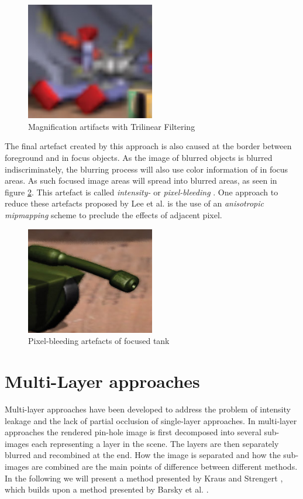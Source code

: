 \begin{figure}[h]
    \centering
    \includegraphics[width=0.5\textwidth]{images/trilinear-filtering.jpg}
    \caption{Magnification artifacts with Trilinear Filtering \cite{Demers.2005}}
    \label{fig:trilinear-filtering}
\end{figure}

The final artefact created by this approach is also caused at the border between foreground and in focus objects.
As the image of blurred objects is blurred indiscriminately, the blurring process will also use color information of in focus areas.
As such focused image areas will spread into blurred areas, as seen in figure \ref{fig:pxl-bleeeding}.
This artefact is called \textit{intensity-} or \textit{pixel-bleeding} \cite{Demers.2005}.
One approach to reduce these artefacts proposed by Lee et al. \cite{Lee.2009} is the use of an \textit{anisotropic mipmapping} scheme to preclude the effects of adjacent pixel.

\begin{figure}[h]
    \centering
    \includegraphics[width=0.5\textwidth]{images/pixel-bleeding.jpg}
    \caption{Pixel-bleeding artefacts of focused tank \cite{Demers.2005}}
    \label{fig:pxl-bleeeding}
\end{figure}

\section{Multi-Layer approaches}
Multi-layer approaches have been developed to address the problem of intensity leakage and the lack of partial occlusion of single-layer approaches.
In multi-layer approaches the rendered pin-hole image is first decomposed into several sub-images each representing a layer in the scene.
The layers are then separately blurred and recombined at the end.
How the image is separated and how the sub-images are combined are the main points of difference between different methods.
In the following we will present a method presented by Kraus and Strengert \cite{Kraus.2007}, which builds upon a method presented by Barsky et al. \cite{BrianA.Barsky.2005}.

